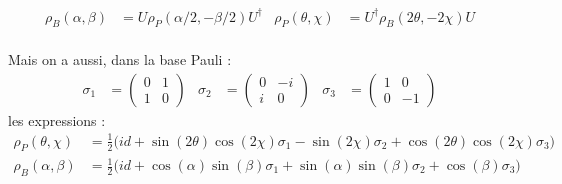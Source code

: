 \begin{annexe}
\begin{align}
	\rho_B(\alpha, \beta) &= U \rho_P(\alpha/2, -\beta/2)U^\dagger  & 
	\rho_P(\theta, \chi) &= U^\dagger \rho_B(2\theta, -2\chi) U
\end{align}
\\
Mais on a aussi, dans la base Pauli :
\begin{align*}
	\sigma_1 &= \begin{pmatrix} 0 & 1 \\ 1 &  0 \end{pmatrix}  &
	\sigma_2 &= \begin{pmatrix} 0 & -i \\  i &  0 \end{pmatrix}  &
	\sigma_3 &= \begin{pmatrix} 1 & 0 \\ 0 & -1 \end{pmatrix}
\end{align*}
les expressions :
\begin{align*}
	\rho_{P}(\theta, \chi) &= \frac{1}{2} \Big( id + \sin(2\theta) \cos(2\chi) \sigma_1 - \sin (2\chi) \sigma_2 + \cos(2\theta) \cos(2\chi) \sigma_3 \Big) \\ 
	\rho_{B}(\alpha, \beta) &= \frac{1}{2} \Big( id + \cos(\alpha) \sin(\beta) \sigma_1 + \sin(\alpha) \sin(\beta) \sigma_2 + \cos (\beta) \sigma_3 \Big)
\end{align*}
\skipl


\end{annexe}
